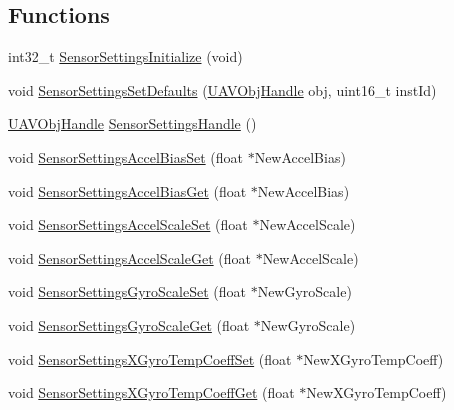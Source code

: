 \subsection*{\-Functions}
\begin{DoxyCompactItemize}
\item 
int32\-\_\-t \hyperlink{group___sensor_settings_ga42fac54a733c7824e978363f67660414}{\-Sensor\-Settings\-Initialize} (void)
\item 
void \hyperlink{group___sensor_settings_ga040d69d52664d76a6eeab4cdef2cc417}{\-Sensor\-Settings\-Set\-Defaults} (\hyperlink{targets_2_u_a_v_objects_2inc_2uavobjectmanager_8h_a279053e22be53ce9f895043aaeb91e3b}{\-U\-A\-V\-Obj\-Handle} obj, uint16\-\_\-t inst\-Id)
\item 
\hyperlink{targets_2_u_a_v_objects_2inc_2uavobjectmanager_8h_a279053e22be53ce9f895043aaeb91e3b}{\-U\-A\-V\-Obj\-Handle} \hyperlink{group___sensor_settings_gaa49e09b756d7d113e1765320ec30f966}{\-Sensor\-Settings\-Handle} ()
\item 
void \hyperlink{group___sensor_settings_gafcf2b9850b6663c7a5528442e28bc716}{\-Sensor\-Settings\-Accel\-Bias\-Set} (float $\ast$\-New\-Accel\-Bias)
\item 
void \hyperlink{group___sensor_settings_ga8b0f8c7443a088ac346d45a0cd420219}{\-Sensor\-Settings\-Accel\-Bias\-Get} (float $\ast$\-New\-Accel\-Bias)
\item 
void \hyperlink{group___sensor_settings_gae4cb5094cb430f56754db34fed60f6ea}{\-Sensor\-Settings\-Accel\-Scale\-Set} (float $\ast$\-New\-Accel\-Scale)
\item 
void \hyperlink{group___sensor_settings_ga1b65501192d6d82b19d81c707c774bee}{\-Sensor\-Settings\-Accel\-Scale\-Get} (float $\ast$\-New\-Accel\-Scale)
\item 
void \hyperlink{group___sensor_settings_ga695d0dfd3f133cba50f37ea6f32e4473}{\-Sensor\-Settings\-Gyro\-Scale\-Set} (float $\ast$\-New\-Gyro\-Scale)
\item 
void \hyperlink{group___sensor_settings_ga3bfcf2173ea013a49c4e554f36ae372f}{\-Sensor\-Settings\-Gyro\-Scale\-Get} (float $\ast$\-New\-Gyro\-Scale)
\item 
void \hyperlink{group___sensor_settings_ga2cdef73425ccef113f965f657f654a29}{\-Sensor\-Settings\-X\-Gyro\-Temp\-Coeff\-Set} (float $\ast$\-New\-X\-Gyro\-Temp\-Coeff)
\item 
void \hyperlink{group___sensor_settings_gaf4d13cbbb8c30f99de5fe646caf0fa58}{\-Sensor\-Settings\-X\-Gyro\-Temp\-Coeff\-Get} (float $\ast$\-New\-X\-Gyro\-Temp\-Coeff)
\item 

\end{DoxyCompactItemize}

